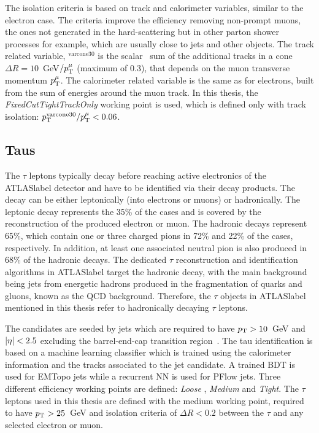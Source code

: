 The isolation criteria is based on track and calorimeter variables, similar to the electron case. The criteria improve the efficiency removing non-prompt muons, the ones not generated in the hard-scattering but in other parton shower processes for example, which are usually close to jets and other objects. The track related variable, \pT$^{\text{varcone30}}$ is the scalar \pT\ sum of the additional tracks in a cone $\Delta R=10$~GeV$/p_{\text{T}}^\mu$ (maximum of 0.3), that depends on the muon transverse momentum $p_{\text{T}}^\mu$. The calorimeter related variable is the same as for electrons, built from the sum of energies around the muon track. In this thesis, the \textit{FixedCutTightTrackOnly} working point is used, which is defined only with track isolation: $p_{\text{T}}^\text{varcone30}/p_{\text{T}}^\mu<0.06$.       

\subsection{Taus}

The $\tau$ leptons typically decay before reaching active electronics of the \acrshort{ATLASlabel} detector and have to be identified via their decay products. The decay can be either leptonically (into electrons or muons) or hadronically. The leptonic decay represents the 35\% of the cases and is covered by the reconstruction of the produced electron or muon. The hadronic decays represent 65\%, which contain one or three charged pions in 72\% and 22\% of the cases, respectively. In addition, at least one associated neutral pion is also produced in 68\% of the hadronic decays. The dedicated $\tau$ reconstruction and identification algorithms in \acrshort{ATLASlabel} target the hadronic decay, with the main background being jets from energetic hadrons produced in the fragmentation of quarks and gluons, known as the \acrshort{QCD} background. Therefore, the $\tau$ objects in \acrshort{ATLASlabel} mentioned in this thesis refer to hadronically decaying $\tau$ leptons. 

The candidates are seeded by jets which are required to have $p_{\text{T}} > 10$~GeV and $\abs{\eta} < 2.5$ excluding the barrel-end-cap transition region~\cite{ATLAS-CONF-2017-029}. The tau identification is based on a machine learning classifier which is trained using the calorimeter information and the tracks associated to the jet candidate. A trained BDT is used for EMTopo jets while a recurrent NN is used for PFlow jets. Three different efficiency working points are defined: \textit{Loose
}, \textit{Medium} and \textit{Tight}. The $\tau$ leptons used in this thesis are defined with the medium working point, required to have $p_{\text{T}}>25$~GeV and isolation criteria of $\Delta R<0.2$ between the $\tau$ and any selected electron or muon.

